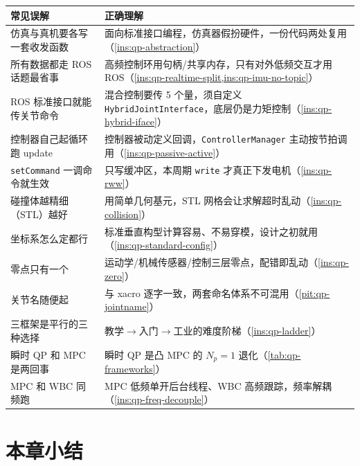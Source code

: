 \begin{table}[H]\centering\small
\begin{tabular}{p{} p{}}
\toprule
\textbf{常见误解} & \textbf{正确理解} \\
\midrule
仿真与真机要各写一套收发函数 & 面向标准接口编程，仿真器假扮硬件，一份代码两处复用（\cref{ins:qp-abstraction}）\\
所有数据都走 ROS 话题最省事 & 高频控制环用句柄/共享内存，只有对外低频交互才用 ROS（\cref{ins:qp-realtime-split,ins:qp-imu-no-topic}）\\
ROS 标准接口就能传关节命令 & 混合控制要传 5 个量，须自定义 \texttt{HybridJointInterface}，底层仍是力矩控制（\cref{ins:qp-hybrid-iface}）\\
控制器自己起循环跑 update & 控制器被动定义回调，\texttt{ControllerManager} 主动按节拍调用（\cref{ins:qp-passive-active}）\\
\texttt{setCommand} 一调命令就生效 & 只写缓冲区，本周期 \texttt{write} 才真正下发电机（\cref{ins:qp-rww}）\\
碰撞体越精细（STL）越好 & 用简单几何基元，STL 网格会让求解超时乱动（\cref{ins:qp-collision}）\\
坐标系怎么定都行 & 标准垂直构型计算容易、不易穿模，设计之初就用（\cref{ins:qp-standard-config}）\\
零点只有一个 & 运动学/机械传感器/控制三层零点，配错即乱动（\cref{ins:qp-zero}）\\
关节名随便起 & 与 xacro 逐字一致，两套命名体系不可混用（\cref{pit:qp-jointname}）\\
三框架是平行的三种选择 & 教学$\to$入门$\to$工业的难度阶梯（\cref{ins:qp-ladder}）\\
瞬时 QP 和 MPC 是两回事 & 瞬时 QP 是凸 MPC 的 $N_p{=}1$ 退化（\cref{tab:qp-frameworks}）\\
MPC 和 WBC 同频跑 & MPC 低频单开后台线程、WBC 高频跟踪，频率解耦（\cref{ins:qp-freq-decouple}）\\
\bottomrule
\end{tabular}
\end{table}

\section*{本章小结}

